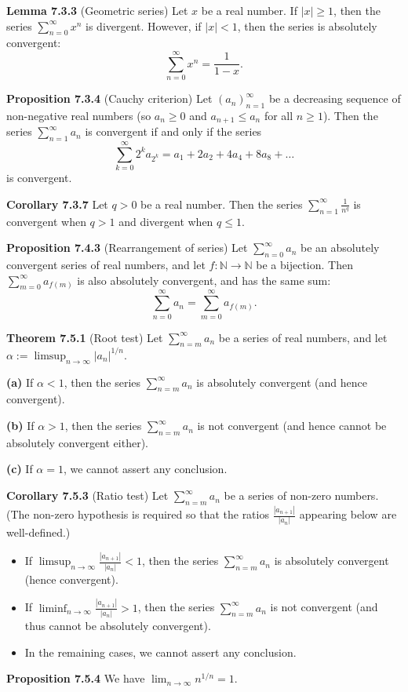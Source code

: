 \documentclass{article}
\begin{document}
\medskip

\textbf{Lemma 7.3.3} (Geometric series) Let $x$ be a real number.
If $|x| \geq 1$, then the series $\sum_{n=0}^{\infty} x^n$ is divergent.
However, if $|x| < 1$, then the series is absolutely convergent:
\[
    \sum_{n=0}^{\infty} x^n = \frac{1}{1 - x}.
\]

\medskip

\textbf{Proposition 7.3.4} (Cauchy criterion) Let $(a_n)_{n=1}^{\infty}$ be a
decreasing sequence of non-negative real numbers (so $a_n \geq 0$ and
$a_{n+1} \leq a_n$ for all $n \geq 1$).
Then the series $\sum_{n=1}^{\infty} a_n$ is convergent if and only if the
series
\[
    \sum_{k=0}^{\infty} 2^k a_{2^k} = a_1 + 2a_2 + 4a_4 + 8a_8 + \dots
\]
is convergent.

\medskip

\textbf{Corollary 7.3.7} Let $q > 0$ be a real number. Then the series
$\sum_{n=1}^{\infty} \frac{1}{n^q}$ is convergent when $q > 1$ and divergent
when $q \leq 1$.

\medskip

\textbf{Proposition 7.4.3} (Rearrangement of series) Let $\sum_{n=0}^{\infty} a_n$
be an absolutely convergent series of real numbers, and let $f: \mathbb{N} \to \mathbb{N}$
be a bijection.
Then $\sum_{m=0}^{\infty} a_{f(m)}$ is also absolutely convergent, and has the
same sum:
\[
    \sum_{n=0}^{\infty} a_n = \sum_{m=0}^{\infty} a_{f(m)}.
\]

\medskip


\textbf{Theorem 7.5.1} (Root test) Let $\sum_{n=m}^{\infty} a_n$ be a series of real
numbers, and let $\alpha := \limsup_{n \to \infty} |a_n|^{1/n}$.

\textbf{(a)} If $\alpha < 1$, then the series $\sum_{n=m}^{\infty} a_n$ is absolutely
convergent (and hence convergent).

\textbf{(b)} If $\alpha > 1$, then the series $\sum_{n=m}^{\infty} a_n$ is not
convergent (and hence cannot be absolutely convergent either).

\textbf{(c)} If $\alpha = 1$, we cannot assert any conclusion.


\medskip


\textbf{Corollary 7.5.3} (Ratio test) Let $\sum_{n=m}^{\infty} a_n$ be a series of
non-zero numbers. (The non-zero hypothesis is required so that the ratios
$\frac{|a_{n+1}|}{|a_n|}$ appearing below are well-defined.)

\begin{itemize}
    \item If $\limsup_{n \to \infty} \frac{|a_{n+1}|}{|a_n|} < 1$, then the series
          $\sum_{n=m}^{\infty} a_n$ is absolutely convergent (hence convergent).

    \item If $\liminf_{n \to \infty} \frac{|a_{n+1}|}{|a_n|} > 1$, then the series
          $\sum_{n=m}^{\infty} a_n$ is not convergent (and thus cannot be absolutely
          convergent).

    \item In the remaining cases, we cannot assert any conclusion.
\end{itemize}


\medskip

\textbf{Proposition 7.5.4} We have
\(
\lim_{n \to \infty} n^{1/n} = 1.
\)
\end{document}

